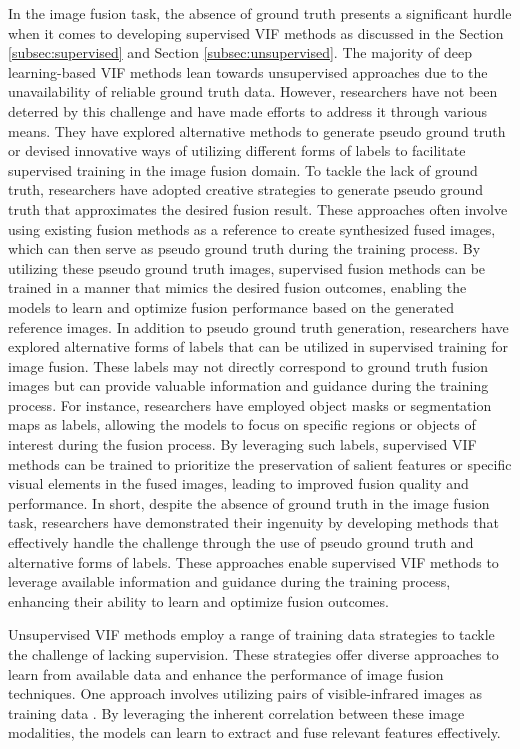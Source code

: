 In the image fusion task, the absence of ground truth presents a significant hurdle when it comes to developing supervised VIF methods as discussed in the Section \ref{subsec:supervised} and Section \ref{subsec:unsupervised}. The majority of deep learning-based VIF methods lean towards unsupervised approaches due to the unavailability of reliable ground truth data. However, researchers have not been deterred by this challenge and have made efforts to address it through various means. They have explored alternative methods to generate pseudo ground truth or devised innovative ways of utilizing different forms of labels to facilitate supervised training in the image fusion domain. To tackle the lack of ground truth, researchers have adopted creative strategies to generate pseudo ground truth that approximates the desired fusion result. These approaches often involve using existing fusion methods as a reference to create synthesized fused images, which can then serve as pseudo ground truth during the training process. By utilizing these pseudo ground truth images, supervised fusion methods can be trained in a manner that mimics the desired fusion outcomes, enabling the models to learn and optimize fusion performance based on the generated reference images. In addition to pseudo ground truth generation, researchers have explored alternative forms of labels that can be utilized in supervised training for image fusion. These labels may not directly correspond to ground truth fusion images but can provide valuable information and guidance during the training process. For instance, researchers have employed object masks or segmentation maps as labels, allowing the models to focus on specific regions or objects of interest during the fusion process. By leveraging such labels, supervised VIF methods can be trained to prioritize the preservation of salient features or specific visual elements in the fused images, leading to improved fusion quality and performance. In short, despite the absence of ground truth in the image fusion task, researchers have demonstrated their ingenuity by developing methods that effectively handle the challenge through the use of pseudo ground truth and alternative forms of labels. These approaches enable supervised VIF methods to leverage available information and guidance during the training process, enhancing their ability to learn and optimize fusion outcomes.

Unsupervised VIF methods employ a range of training data strategies to tackle the challenge of lacking supervision. These strategies offer diverse approaches to learn from available data and enhance the performance of image fusion techniques. One approach involves utilizing pairs of visible-infrared images as training data \cite{rao2023tgfuse, xu2021classification, song2022triple}. By leveraging the inherent correlation between these image modalities, the models can learn to extract and fuse relevant features effectively.

